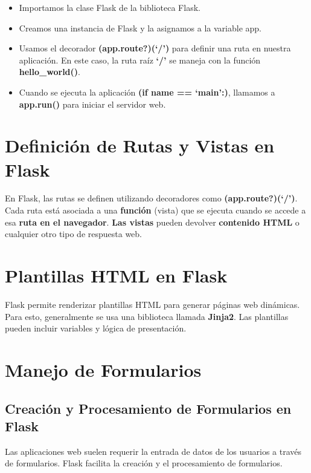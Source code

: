 \documentclass[
  a4paper,
  DIV=11,
  numbers=noendperiod,
  onepage,
  openany]{scrreprt}
\providecommand{\tightlist}{%
  \setlength{\itemsep}{0pt}\setlength{\parskip}{0pt}}\usepackage{longtable,booktabs,array}
\begin{document}
\begin{itemize}
\tightlist
\item
  Importamos la clase Flask de la biblioteca Flask.
\item
  Creamos una instancia de Flask y la asignamos a la variable app.
\item
  Usamos el decorador \textbf{(\textbf{app.route?})(`/')} para definir
  una ruta en nuestra aplicación. En este caso, la ruta raíz
  \textbf{`/'} se maneja con la función \textbf{hello\_world()}.
\item
  Cuando se ejecuta la aplicación \textbf{(if \textbf{name} ==
  `\textbf{main}':)}, llamamos a \textbf{app.run()} para iniciar el
  servidor web.
\end{itemize}

\section{Definición de Rutas y Vistas en
Flask}\label{definiciuxf3n-de-rutas-y-vistas-en-flask}

En Flask, las rutas se definen utilizando decoradores como
\textbf{(\textbf{app.route?})(`/')}. Cada ruta está asociada a una
\textbf{función} (vista) que se ejecuta cuando se accede a esa
\textbf{ruta en el navegador}. \textbf{Las vistas} pueden devolver
\textbf{contenido HTML} o cualquier otro tipo de respuesta web.

\section{Plantillas HTML en Flask}\label{plantillas-html-en-flask}

Flask permite renderizar plantillas HTML para generar páginas web
dinámicas. Para esto, generalmente se usa una biblioteca llamada
\textbf{Jinja2}. Las plantillas pueden incluir variables y lógica de
presentación.

\section{Manejo de Formularios}\label{manejo-de-formularios}

\subsection{Creación y Procesamiento de Formularios en
Flask}\label{creaciuxf3n-y-procesamiento-de-formularios-en-flask}

Las aplicaciones web suelen requerir la entrada de datos de los usuarios
a través de formularios. Flask facilita la creación y el procesamiento
de formularios.
\end{document}
